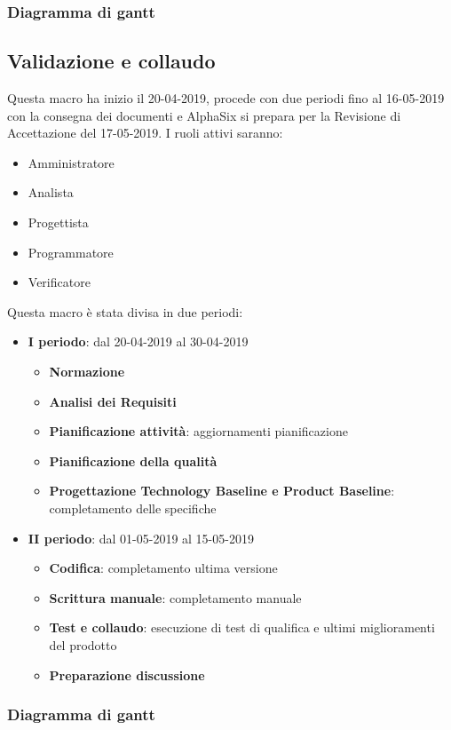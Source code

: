             \subsubsection{Diagramma di gantt}

        \subsection{Validazione e collaudo}
        Questa macro ha inizio il 20-04-2019, procede con due periodi fino al 16-05-2019 con la consegna dei documenti e AlphaSix si
        prepara per la Revisione di Accettazione del 17-05-2019. I ruoli attivi saranno: 
        \begin{itemize}
            \item Amministratore
            \item Analista
            \item Progettista
            \item Programmatore
            \item Verificatore
        \end{itemize}
        Questa macro è stata divisa in due periodi:
		\begin{itemize}
			\item \textbf{I periodo}: dal 20-04-2019 al 30-04-2019
			\begin{itemize}
    	        \item \textbf{Normazione}
    	        \item \textbf{Analisi dei Requisiti}
    	        \item \textbf{Pianificazione attività}: aggiornamenti pianificazione
    	        \item \textbf{Pianificazione della qualità}
    	        \item \textbf{Progettazione Technology Baseline e Product Baseline}: completamento delle specifiche
        	\end{itemize}
			\item \textbf{II periodo}: dal 01-05-2019 al 15-05-2019
			\begin{itemize}
    	        \item \textbf{Codifica}: completamento ultima versione
    	        \item \textbf{Scrittura manuale}: completamento manuale
    	        \item \textbf{Test e collaudo}: esecuzione di test di qualifica e ultimi miglioramenti del prodotto
    	        \item \textbf{Preparazione discussione}
        	\end{itemize}
		\end{itemize}
        
        
            \subsubsection{Diagramma di gantt}
